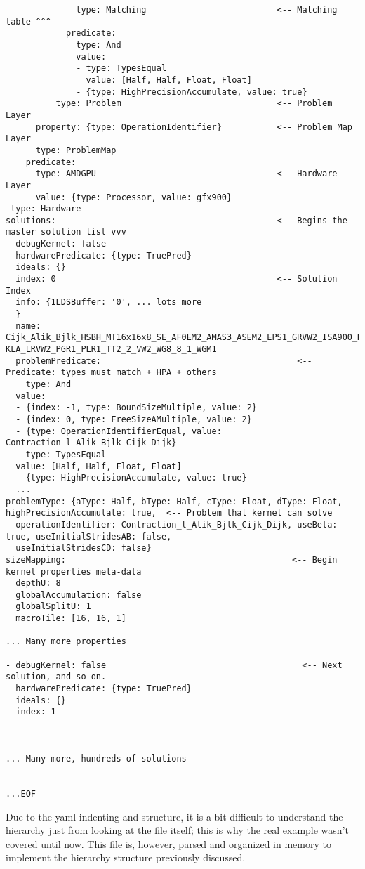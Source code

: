 \documentclass[]{article}
\begin{document}
\begin{verbatim}
              type: Matching                          <-- Matching table ^^^
            predicate:
              type: And
              value:
              - type: TypesEqual
                value: [Half, Half, Float, Float]
              - {type: HighPrecisionAccumulate, value: true}
          type: Problem                               <-- Problem Layer
      property: {type: OperationIdentifier}           <-- Problem Map Layer
      type: ProblemMap
    predicate:
      type: AMDGPU                                    <-- Hardware Layer
      value: {type: Processor, value: gfx900}
 type: Hardware
solutions:                                            <-- Begins the master solution list vvv
- debugKernel: false
  hardwarePredicate: {type: TruePred}
  ideals: {}
  index: 0                                            <-- Solution Index
  info: {1LDSBuffer: '0', ... lots more
  }
  name: Cijk_Alik_Bjlk_HSBH_MT16x16x8_SE_AF0EM2_AMAS3_ASEM2_EPS1_GRVW2_ISA900_K1_ KLA_LRVW2_PGR1_PLR1_TT2_2_VW2_WG8_8_1_WGM1
  problemPredicate:                                       <-- Predicate: types must match + HPA + others
    type: And
  value:
  - {index: -1, type: BoundSizeMultiple, value: 2}
  - {index: 0, type: FreeSizeAMultiple, value: 2}
  - {type: OperationIdentifierEqual, value: Contraction_l_Alik_Bjlk_Cijk_Dijk}
  - type: TypesEqual
  value: [Half, Half, Float, Float]
  - {type: HighPrecisionAccumulate, value: true}
  ...
problemType: {aType: Half, bType: Half, cType: Float, dType: Float, highPrecisionAccumulate: true,  <-- Problem that kernel can solve
  operationIdentifier: Contraction_l_Alik_Bjlk_Cijk_Dijk, useBeta: true, useInitialStridesAB: false,
  useInitialStridesCD: false}
sizeMapping:                                             <-- Begin kernel properties meta-data
  depthU: 8
  globalAccumulation: false
  globalSplitU: 1
  macroTile: [16, 16, 1]

... Many more properties

- debugKernel: false                                       <-- Next solution, and so on.
  hardwarePredicate: {type: TruePred}
  ideals: {}
  index: 1



... Many more, hundreds of solutions


...EOF
\end{verbatim}

\noindent
Due to the yaml indenting and structure, it is a bit difficult to understand the hierarchy just from looking at the file itself; this is why the real example wasn't covered until now. This file is, however, parsed and organized in memory to implement the hierarchy structure previously discussed.
\end{document}
